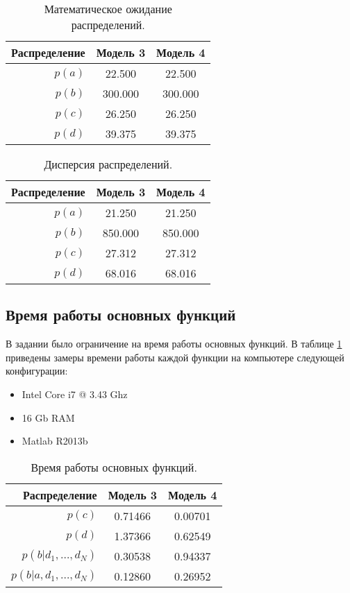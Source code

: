 \documentclass[12pt,a4paper]{article}
\begin{document}
\begin{table}[hbtp]
  \centering
  \begin{tabular}{r|c|c}
    Распределение & Модель 3 & Модель 4 \\ \hline
    $p(a)$ & 22.500 & 22.500 \\ \hline
    $p(b)$ & 300.000 & 300.000 \\ \hline
    $p(c)$ & 26.250 & 26.250 \\ \hline
    $p(d)$ & 39.375 & 39.375 \\ \hline
  \end{tabular}
  \caption{Математическое ожидание распределений.}
\end{table}
\begin{table}[hbtp]
  \centering
  \begin{tabular}{r|c|c}
    Распределение & Модель 3 & Модель 4\\ \hline
    $p(a)$ & 21.250 & 21.250 \\ \hline
    $p(b)$ & 850.000 & 850.000 \\ \hline
    $p(c)$ & 27.312 & 27.312 \\ \hline
    $p(d)$ & 68.016 & 68.016 \\ \hline
  \end{tabular}
  \caption{Дисперсия распределений.}
\end{table}

\subsection{Время работы основных функций}

В задании было ограничение на время работы основных функций.
В таблице \ref{tbl:time} приведены замеры времени работы каждой функции на компьютере следующей конфигурации:

\begin{itemize}
  \item Intel Core i7 @ 3.43 Ghz
  \item 16 Gb RAM
  \item Matlab R2013b
\end{itemize}

\begin{table}[hbtp]
  \centering
  \begin{tabular}{r|c|c}
    Распределение & Модель 3 & Модель 4 \\ \hline
    $p(c)$ & 0.71466 & 0.00701 \\ \hline
    $p(d)$ & 1.37366 & 0.62549 \\ \hline
    $p(b|d_1, \dots, d_N)$ & 0.30538 & 0.94337 \\ \hline
    $p(b|a, d_1, \dots, d_N)$ & 0.12860 & 0.26952 \\ \hline
  \end{tabular}
\caption{Время работы основных функций.}
\label{tbl:time}
\end{table}
\end{document}
